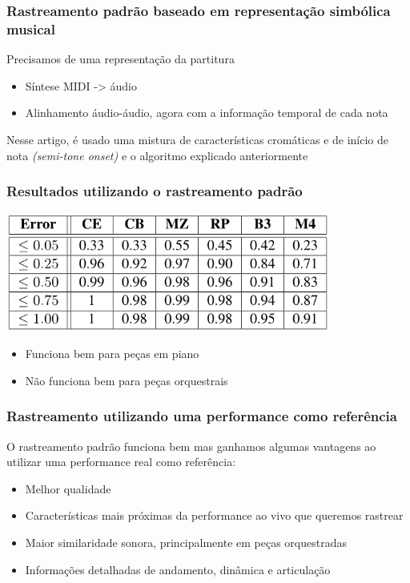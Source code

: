 \begin{frame}
  \frametitle{Rastreamento padrão baseado em representação simbólica musical}
  Precisamos de uma representação da partitura\pause
  \begin{itemize}
    \item Síntese MIDI -> áudio\\\pause
    \item Alinhamento áudio-áudio, agora com a informação temporal de cada nota\pause
  \end{itemize}
  Nesse artigo, é usado uma mistura de características cromáticas e de início de nota \emph{(semi-tone onset)} e o algoritmo explicado anteriormente
\end{frame}

\begin{frame}
  \frametitle{Resultados utilizando o rastreamento padrão}
  \begin{center}
    \includegraphics[width=0.8\textwidth]{src/img/1-Table2-1.png}
  \end{center}
  \pause
  \begin{itemize}
    \item Funciona bem para peças em piano\\\pause
    \item Não funciona bem para peças orquestrais
  \end{itemize}
\end{frame}

\begin{frame}
  \frametitle{Rastreamento utilizando uma performance como referência}
  O rastreamento padrão funciona bem mas ganhamos algumas vantagens ao utilizar uma performance real como referência:\pause
  \begin{itemize}
    \item Melhor qualidade
    \item Características mais próximas da performance ao vivo que queremos rastrear
    \item Maior similaridade sonora, principalmente em peças orquestradas
    \item Informações detalhadas de andamento, dinâmica e articulação
  \end{itemize}
\end{frame}

